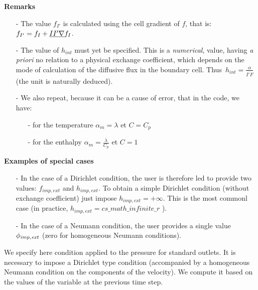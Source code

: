 \newpage

{\bf Remarks }
\begin{itemize}
\item [-] The value $f_{I'}$ is calculated using the cell gradient of $f$,
that is: $f_{I'}=f_{I}+\underline{II'}\underline{\nabla}{f}_I$.
\item [-] The value of $h_{int}$ must yet be specified. This is a {\it numerical}, value,
having {\it a priori} no relation to a physical exchange coefficient,
which depends on the mode of calculation of the diffusive flux in the boundary cell.
Thus~$\displaystyle h_{int}=\displaystyle\frac{\alpha}{\overline{I'F}}$
(the unit is naturally deduced).
\item [-] We also repeat, because it can be a cause of error, that in the code, we have:
        \begin{itemize}
        \item [-] for the temperature $\alpha_m=\lambda$ et $C=C_p$
        \item [-] for the enthalpy      $\alpha_m=\displaystyle\frac{\lambda}{C_p}$ et $C=1$
        \end{itemize}
\end{itemize}

{\bf Examples of special cases}
\begin{itemize}
\item [-] In the case of a Dirichlet condition,
the user is therefore led to
provide two values: $f_{imp,ext}$ and $h_{imp,ext}$.
To obtain a simple Dirichlet condition (without exchange coefficient)
just impose $h_{imp,ext}=+\infty$. This is the most commonl case
(in practice, $h_{imp,ext}=cs\_math\_infinite\_r$ ).
\item [-] In the case of a Neumann condition, the user provides a single value
$\phi_{\text{\it imp,ext}}$ (zero for homogeneous Neumann conditions).

\end{itemize}

\label{Base_Condli_Sortie_Pression}
We specify here condition applied to the
pressure for standard outlets.
It is necessary to impose a Dirichlet type condition (accompanied by a
homogeneous Neumann condition on the components of the velocity). We compute it
based on the values of the variable at the previous time step.

